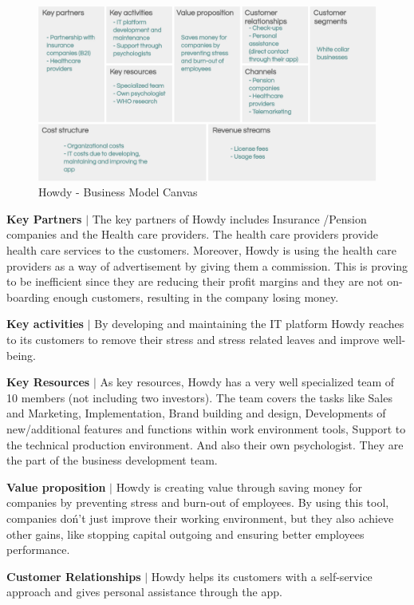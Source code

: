 \begin{figure}[H]
\centering
\includegraphics[width=14cm]{figures/BMC3.png}
\caption{Howdy - Business Model Canvas}
\label{fig:BCmodel}
\end{figure}

\noindent \textbf{Key Partners} $|$ The key partners of Howdy includes Insurance /Pension companies and the Health care providers. The health care providers provide health care services to the customers. Moreover, Howdy is using the health care providers as a way of advertisement by giving them a commission. This is proving to be inefficient since they are reducing their profit margins and they are not on-boarding enough customers, resulting in the company losing money.

\noindent \textbf{Key activities} $|$ By developing and maintaining the IT platform Howdy reaches to its customers to remove their stress and stress related leaves and improve well-being.

\noindent \textbf{Key Resources} $|$ As key resources, Howdy has a very well specialized team of 10 members (not including two investors). The team covers the tasks like Sales and Marketing, Implementation, Brand building and design, Developments of new/additional features and functions within work environment tools, Support to the technical production environment. And also their own psychologist. They are the part of the business development team.

\noindent \textbf{Value proposition} $|$ Howdy is creating value through saving money for companies by preventing stress and burn-out of employees. By using this tool, companies doń't just improve their working environment, but they also achieve other gains, like stopping capital outgoing and ensuring better employees performance.

\noindent \textbf{Customer Relationships} $|$ Howdy helps its customers with a self-service approach and gives personal assistance through the app.

